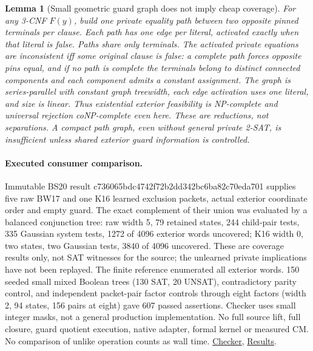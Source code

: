 \documentclass[11pt]{article}
\newtheorem{lemma}[theorem]{Lemma}
\begin{document}
\begin{lemma}[Small geometric guard graph does not imply cheap coverage]\label{lem:gd28-path}
For any 3-CNF $F(y)$, build one private equality path between two opposite pinned terminals per clause. Each path has one edge per literal, activated exactly when that literal is false. Paths share only terminals. The activated private equations are inconsistent iff some original clause is false: a complete path forces opposite pins equal, and if no path is complete the terminals belong to distinct connected components and each component admits a constant assignment. The graph is series-parallel with constant graph treewidth, each edge activation uses one literal, and size is linear. Thus existential exterior feasibility is NP-complete and universal rejection coNP-complete even here. These are reductions, not separations. A compact path graph, even without general private 2-SAT, is insufficient unless shared exterior guard information is controlled.
\end{lemma}
\paragraph{Executed consumer comparison.} Immutable BS20 result c736065bdc4742f72b2dd342bc6ba82c70eda701 supplies five raw BW17 and one K16 learned exclusion packets, actual exterior coordinate order and empty guard. The exact complement of their union was evaluated by a balanced conjunction tree: raw width 5, 79 retained states, 244 child-pair tests, 335 Gaussian system tests, 1272 of 4096 exterior words uncovered; K16 width 0, two states, two Gaussian tests, 3840 of 4096 uncovered. These are coverage results only, not SAT witnesses for the source; the unlearned private implications have not been replayed. The finite reference enumerated all exterior words. 150 seeded small mixed Boolean trees (130 SAT, 20 UNSAT), contradictory parity control, and independent packet-pair factor controls through eight factors (width 2, 94 states, 156 pairs at eight) gave 607 passed assertions. Checker uses small integer masks, not a general production implementation. No full source lift, full closure, guard quotient execution, native adapter, formal kernel or measured CM. No comparison of unlike operation counts as wall time. \href{https://github.com/j15marti/pnp/commit/235e37ac60c09afbd246dd15a26c97bae133a8b4}{Checker}, \href{https://github.com/j15marti/pnp/commit/361109be1fd0356f1dc9ea1b78ae2e19c197b1af}{Results}.
\end{document}
